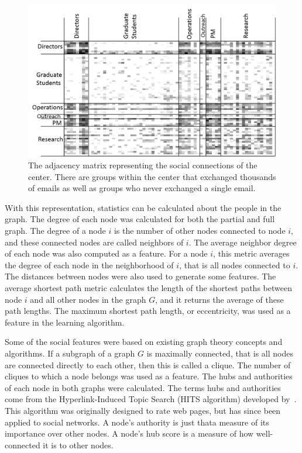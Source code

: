 \documentclass[10pt,twocolumn,conference]{IEEEtran}
\begin{document}
\begin{figure}[t]
    \centering
    \includegraphics[width=\columnwidth,trim={4mm 0mm 0mm 5mm},clip]{adj_matrix}
    \vspace{-14pt}
    \caption{The adjacency matrix representing the social connections of the center.  There are groups within the center that exchanged thousands of emails as well as groups who never exchanged a single email.}
    \vspace{-14pt}
    \label{fig:adj_matrix}
\end{figure}

With this representation, statistics can be calculated about the people in the graph.
The degree of each node was calculated for both the partial and full graph.
The degree of a node $i$ is the number of other nodes connected to node $i$, and these connected nodes are called neighbors of $i$.
The average neighbor degree of each node was also computed as a feature.
For a node $i$, this metric averages the degree of each node in the neighborhood of $i$, that is all nodes connected to $i$.
The distances between nodes were also used to generate some features.
The average shortest path metric calculates the length of the shortest paths between node $i$ and all other nodes in the graph $G$, and it returns the average of these path lengths.
The maximum shortest path length, or eccentricity, was used as a feature in the learning algorithm.  

Some of the social features were based on existing graph theory concepts and algorithms.
If a subgraph of a graph $G$ is maximally connected, that is all nodes are connected directly to each other, then this is called a clique.
The number of cliques to which a node belongs was used as a feature.
The hubs and authorities of each node in both graphs were calculated.
The terms hubs and authorities come from the Hyperlink-Induced Topic Search (HITS algorithm) developed by~\cite{kleinberg_hubs_1999}.
This algorithm was originally designed to rate web pages, but has since been applied to social networks.
A node's authority is just that\textemdash{}a measure of its importance over other nodes.
A node's hub score is a measure of how well-connected it is to other nodes.
\end{document}
